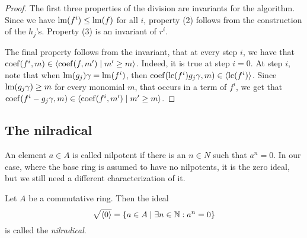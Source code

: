 \begin{proof}
  The first three properties of the division are invariants for the algorithm. Since we have $\operatorname{lm}(f^{i}) \leq \operatorname{lm}(f)$ for all $i$, property (2) follows from the construction of the $h_{j}$'s. Property (3) is an invariant of $r^{i}$.

  The final property follows from the invariant, that at every step $i$, we have that $\operatorname{coef}(f^{i}, m) \in \langle \operatorname{coef}(f, m') \mid m' \geq m \rangle$. Indeed, it is true at step $i=0$. At step $i$, note that when $\operatorname{lm}(g_{j}) \gamma = \operatorname{lm}(f^{i})$, then $\operatorname{coef}(\operatorname{lc}(f^{i})g_{j} \gamma, m) \in \langle \operatorname{lc}(f^{i}) \rangle$. Since $\operatorname{lm}(g_{j} \gamma) \geq m$ for every monomial $m$, that occurs in a term of $f^{i}$, we get that $\operatorname{coef}(f^{i} - g_{j} \gamma, m) \in \langle \operatorname{coef}(f^{i}, m') \mid m' \geq m \rangle$.
\end{proof}




\subsection{The nilradical}
An element $a \in A$ is called nilpotent if there is an $n \in N$ such that $a^{n} = 0$. In our case, where the base ring is assumed to have no nilpotents, it is the zero ideal, but we still need a different characterization of it.

\begin{definition}[Nilradical]
  Let $A$ be a commutative ring. Then the ideal \[\sqrt{\langle 0 \rangle} = \{a \in A \mid \exists n \in \mathbb{N} : a^{n} = 0\}\] is called the \textit{nilradical}.
\end{definition}

